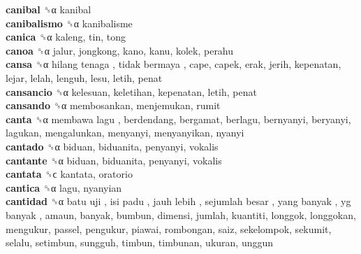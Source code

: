 \textbf{canibal} ␝α  kanibal  \\
\textbf{canibalismo} ␝α  kanibalisme  \\
\textbf{canica} ␝α  kaleng, tin, tong  \\
\textbf{canoa} ␝α  jalur, jongkong, kano, kanu, kolek, perahu  \\
\textbf{cansa} ␝α   hilang tenaga ,  tidak bermaya , cape, capek, erak, jerih, kepenatan, lejar, lelah, lenguh, lesu, letih, penat  \\
\textbf{cansancio} ␝α  kelesuan, keletihan, kepenatan, letih, penat  \\
\textbf{cansando} ␝α  membosankan, menjemukan, rumit  \\
\textbf{canta} ␝α   membawa lagu , berdendang, bergamat, berlagu, bernyanyi, beryanyi, lagukan, mengalunkan, menyanyi, menyanyikan, nyanyi  \\
\textbf{cantado} ␝α  biduan, biduanita, penyanyi, vokalis  \\
\textbf{cantante} ␝α  biduan, biduanita, penyanyi, vokalis  \\
\textbf{cantata} ␝ϲ  kantata, oratorio  \\
\textbf{cantica} ␝α  lagu, nyanyian  \\
\textbf{cantidad} ␝α   batu uji ,  isi padu ,  jauh lebih ,  sejumlah besar ,  yang banyak ,  yg banyak , amaun, banyak, bumbun, dimensi, jumlah, kuantiti, longgok, longgokan, mengukur, passel, pengukur, piawai, rombongan, saiz, sekelompok, sekumit, selalu, setimbun, sungguh, timbun, timbunan, ukuran, unggun  \\
